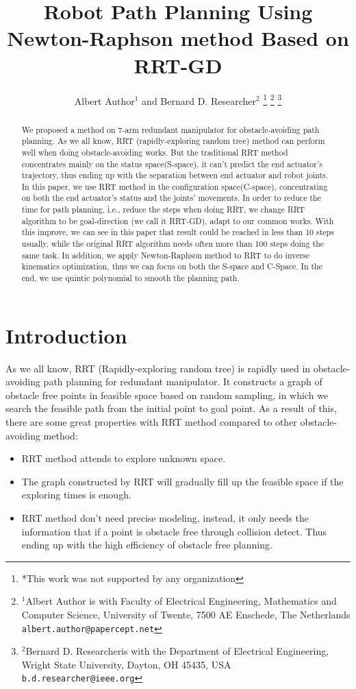 \documentclass[letterpaper, 10 pt, conference]{ieeeconf}  %
\title{\LARGE \bf
Robot Path Planning Using Newton-Raphson method Based on RRT-GD
}
\author{Albert Author$^{1}$ and Bernard D. Researcher$^{2}$%
\thanks{*This work was not supported by any organization}%
\thanks{$^{1}$Albert Author is with Faculty of Electrical Engineering, Mathematics and Computer Science,
        University of Twente, 7500 AE Enschede, The Netherlands
        {\tt\small albert.author@papercept.net}}%
\thanks{$^{2}$Bernard D. Researcheris with the Department of Electrical Engineering, Wright State University,
        Dayton, OH 45435, USA
        {\tt\small b.d.researcher@ieee.org}}%
}
\begin{document}
\maketitle
\thispagestyle{empty}
\pagestyle{empty}


\begin{abstract}

We proposed a method on 7-arm redundant manipulator for obstacle-avoiding path planning. As we all know, RRT (rapidly-exploring random tree) method can perform well when doing obstacle-avoiding works. But the traditional RRT method concentrates mainly on the status space(S-space), it can’t predict the end actuator’s trajectory, thus ending up with the separation between end actuator and robot joints. In this paper, we use RRT method in the configuration space(C-space), concentrating on both the end actuator’s status and the joints’ movements. In order to reduce the time for path planning, i.e., reduce the steps when doing RRT, we change RRT algorithm to be goal-direction (we call it RRT-GD), adapt to our common works. With this improve, we can see in this paper that result could be reached in less than 10 steps usually, while the original RRT algorithm needs often more than 100 steps doing the same task. In addition, we apply Newton-Raphson method to RRT to do inverse kinematics optimization, thus we can focus on both the S-space and C-Space. In the end, we use quintic polynomial to smooth the planning path.

\end{abstract}


\section{Introduction}

As we all know, RRT (Rapidly-exploring random tree) is rapidly used in obstacle-avoiding path planning for redundant manipulator. It constructs a graph of obstacle free points in feasible space based on random sampling, in which we search the feasible path from the initial point to goal point. As a result of this, there are some great properties with RRT method compared to other obstacle-avoiding method:
\begin{itemize}
\item RRT method attends to explore unknown space. 
\item The graph constructed by RRT will gradually fill up the feasible space if the exploring times is enough.
\item RRT method don’t need precise modeling, instead, it only needs the information that if a point is obstacle free through collision detect. Thus ending up with the high efficiency of obstacle free planning.
\end{itemize}
\end{document}
